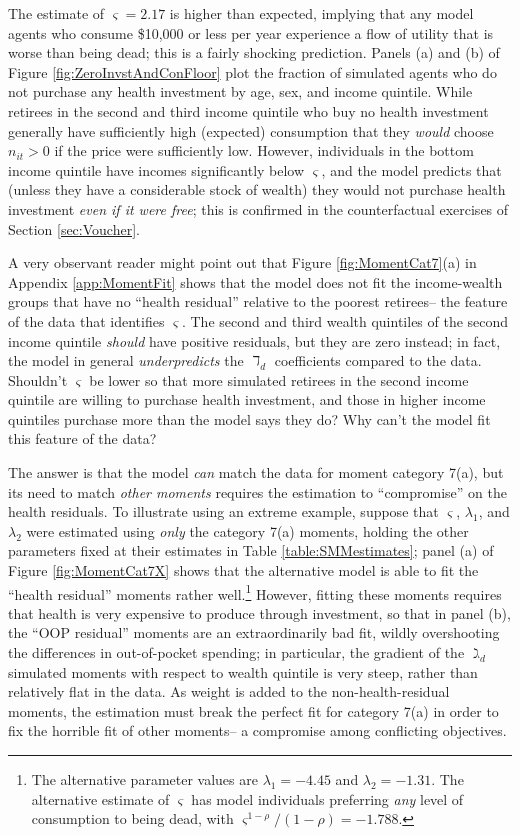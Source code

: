 \documentclass[12pt,pdftex,letterpaper]{article}
\newcommand{\Invst}{n}
\newcommand{\LifeUtility}{\varsigma}
\newcommand{\CRRAcon}{\rho}
\newcommand{\HealthProdParamAlt}{\lambda}
\begin{document}
The estimate of $\LifeUtility=2.17$ is higher than expected, implying that any model agents who consume \$10,000 or less per year experience a flow of utility that is worse than being dead; this is a fairly shocking prediction.  Panels (a) and (b) of Figure \ref{fig:ZeroInvstAndConFloor} plot the fraction of simulated agents who do not purchase any health investment by age, sex, and income quintile.  While retirees in the second and third income quintile who buy no health investment generally have sufficiently high (expected) consumption that they \textit{would} choose $\Invst_{it} > 0$ if the price were sufficiently low.  However, individuals in the bottom income quintile have incomes significantly below $\LifeUtility$, and the model predicts that (unless they have a considerable stock of wealth) they would not purchase health investment \textit{even if it were free}; this is confirmed in the counterfactual exercises of Section \ref{sec:Voucher}.

A very observant reader might point out that Figure \ref{fig:MomentCat7}(a) in Appendix \ref{app:MomentFit} shows that the model does not fit the income-wealth groups that have no ``health residual'' relative to the poorest retirees-- the feature of the data that identifies $\LifeUtility$.  The second and third wealth quintiles of the second income quintile \textit{should} have positive residuals, but they are zero instead; in fact, the model in general \textit{underpredicts} the $\daleth_d$ coefficients compared to the data. Shouldn't $\LifeUtility$ be lower so that more simulated retirees in the second income quintile are willing to purchase health investment, and those in higher income quintiles purchase more than the model says they do?  Why can't the model fit this feature of the data?

The answer is that the model \textit{can} match the data for moment category 7(a), but its need to match \textit{other moments} requires the estimation to ``compromise'' on the health residuals.  To illustrate using an extreme example, suppose that $\LifeUtility$, $\HealthProdParamAlt_1$, and $\HealthProdParamAlt_2$ were estimated using \textit{only} the category 7(a) moments, holding the other parameters fixed at their estimates in Table \ref{table:SMMestimates}; panel (a) of Figure \ref{fig:MomentCat7X} shows that the alternative model is able to fit the ``health residual'' moments rather well.\footnote{The alternative parameter values are $\HealthProdParamAlt_1=-4.45$ and $\HealthProdParamAlt_2=-1.31$.  The alternative estimate of $\LifeUtility$ has model individuals preferring \textit{any} level of consumption to being dead, with $\LifeUtility^{1-\CRRAcon}/(1-\CRRAcon)=-1.788$.}  However, fitting these moments requires that health is very expensive to produce through investment, so that in panel (b), the ``OOP residual'' moments are an extraordinarily bad fit, wildly overshooting the differences in out-of-pocket spending; in particular, the gradient of the $\gimel_d$ simulated moments with respect to wealth quintile is very steep, rather than relatively flat in the data.  As weight is added to the non-health-residual moments, the estimation must break the perfect fit for category 7(a) in order to fix the horrible fit of other moments-- a compromise among conflicting objectives.
\end{document}

